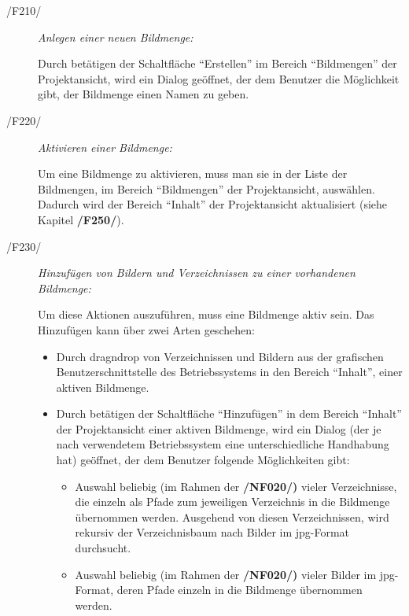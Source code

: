 	\begin{description}
		
		\item[/F210/] \textit{Anlegen einer neuen Bildmenge:}\par Durch betätigen der Schaltfläche "`Erstellen"' im Bereich "`Bildmengen"' der Projektansicht, wird ein Dialog geöffnet, der dem Benutzer die Möglichkeit gibt, der Bildmenge einen Namen zu geben.
		
		\item[/F220/] \textit{Aktivieren einer Bildmenge:}\par Um eine Bildmenge zu aktivieren, muss man sie in der Liste der Bildmengen, im Bereich "`Bildmengen"' der Projektansicht, auswählen. Dadurch wird der Bereich "`Inhalt"' der Projektansicht aktualisiert (siehe Kapitel \textbf{/F250/}).
		
		\item[/F230/] \textit{Hinzufügen von Bildern und Verzeichnissen zu einer vorhandenen Bildmenge:}\par Um diese Aktionen auszuführen, muss eine Bildmenge aktiv sein. Das Hinzufügen kann über zwei Arten geschehen:
		
			\begin{itemize}
				
				\item Durch \gls{dragndrop} von Verzeichnissen und Bildern aus der grafischen Benutzerschnittstelle des Betriebssystems in den Bereich "`Inhalt"', einer aktiven Bildmenge. 
				
				\item Durch betätigen der Schaltfläche "`Hinzufügen"' in dem Bereich "`Inhalt"' der Projektansicht einer aktiven Bildmenge, wird ein Dialog (der je nach verwendetem Betriebssystem eine unterschiedliche Handhabung hat) geöffnet, der dem Benutzer folgende Möglichkeiten gibt:
				
					\begin{itemize}
			
						\item Auswahl beliebig (im Rahmen der \textbf{/NF020/)} vieler Verzeichnisse, die einzeln als Pfade zum jeweiligen Verzeichnis in die Bildmenge übernommen werden. Ausgehend von diesen Verzeichnissen, wird rekursiv der Verzeichnisbaum nach Bilder im \gls{jpg}-Format durchsucht.
						
						\item Auswahl beliebig (im Rahmen der \textbf{/NF020/)} vieler Bilder im \gls{jpg}-Format, deren Pfade einzeln in die Bildmenge übernommen werden.
					

\end{itemize}
\end{itemize}
\end{description}
